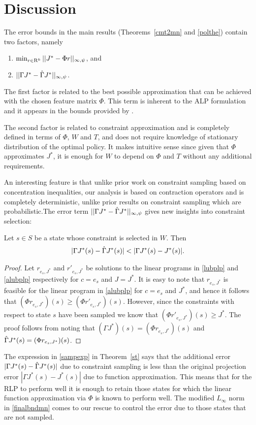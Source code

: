 \section{Discussion}
The error bounds in the main results (Theorems~\ref{cmt2mn} and \ref{polthe}) contain two factors, namely
\begin{enumerate}
\item $\min_{r\in \mathrm{R}^k} ||J^*-\Phi r||_{\infty,\psi}$, and
\item $||\Gamma J^*-\hat{\Gamma} J^*||_{\infty,\psi}$.
\end{enumerate}
The first factor is related to the best possible approximation that can be achieved with the chosen feature matrix $\Phi$. This term is inherent to the ALP formulation and it appears in the bounds provided by \cite{ALP}.\par
The second factor is related to constraint approximation and is completely defined in terms of $\Phi$, $W$ and $T$, and does not require knowledge of stationary distribution of the optimal policy. It makes intuitive sense since given that $\Phi$ approximates $J^*$, it is enough for $W$ to depend on $\Phi$ and $T$ without any additional requirements.\par An interesting feature is that unlike prior work on constraint sampling based on concentration inequalities, our analysis is based on contraction operators and is completely deterministic, unlike prior results on constraint sampling \cite{CS} which are probabilistic.The error term $||\Gamma J^*-\hat{\Gamma} J^*||_{\infty,\psi}$ gives new insights into constraint selection:
\begin{theorem}\label{st}
Let $s\in S$ be a state whose constraint is selected in $W$. 
Then
\begin{align}\label{sampexp}
|\Gamma J^*(s)-\hg J^*(s)|<|\Gamma J^*(s)-J^*(s)|.
\end{align}
\end{theorem}
\begin{proof}
Let $r_{e_s,J^*}$ and ${r}'_{e_s,J^*}$ be solutions to the linear programs in \eqref{lubplp} and \eqref{alubplp} respectively for $c=e_s$ and $J=J^*$. It is easy to note that $r_{e_s,J^*}$ is feasible for the linear program in \eqref{alubplp} for $c=e_s$ and $J^*$, and hence it follows that $(\Phi r_{e_s,J^*})(s)\geq (\Phi {r}'_{e_s,J^*})(s)$. However, since the constraints with respect to state $s$ have been sampled we know that $(\Phi {r}'_{e_s,J^*})(s)\geq J^*$. The proof follows from noting that $(\Gamma J^*)(s)=(\Phi r_{e_s,J^*})(s)$ and $\hat{\Gamma} J^*(s)=(\Phi {r}_{e_s,J^*})(s)$.
\end{proof}
The expression in \eqref{sampexp} in Theorem~\ref{st} says that the additional error $|\Gamma J^*(s) -\hat{\Gamma} J^*(s)|$ due to constraint sampling  is less than the original projection error $|\Gamma J^*(s)-J^*(s)|$ due to function approximation. This means that for the RLP to perform well it is enough to retain those states for which the linear function approximation via $\Phi$ is known to perform well. The modified $L_\infty$ norm in \eqref{finalbndmn} comes to our rescue to control the error due to those states that are not sampled. 